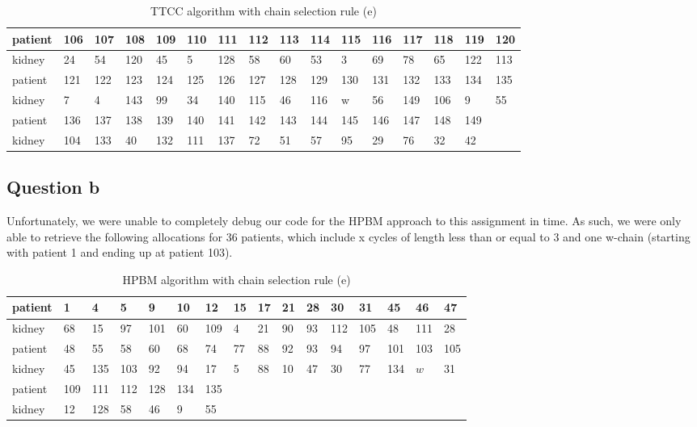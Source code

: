\documentclass{article}
\begin{document}
\begin{table}[H]
\begin{tabular}{llllllllllllllll}
        \toprule
        patient & 106 & 107 & 108 & 109 & 110 & 111 & 112 & 113 & 114 & 115 & 116 & 117 & 118 & 119 & 120 \\ \midrule
        kidney  & 24  & 54  & 120 & 45  & 5   & 128 & 58  & 60  & 53  & 3   & 69  & 78  & 65  & 122 & 113 \\ 
        \bottomrule
        
        \toprule
        patient & 121 & 122 & 123 & 124 & 125 & 126 & 127 & 128 & 129 & 130 & 131 & 132 & 133 & 134 & 135 \\ \midrule
        kidney  & 7   & 4   & 143 & 99  & 34  & 140 & 115 & 46  & 116 & w   & 56  & 149 & 106 & 9   & 55 \\
        \bottomrule

        \toprule
        patient & 136 & 137 & 138 & 139 & 140 & 141 & 142 & 143 & 144 & 145 & 146 & 147 & 148 & 149 &  \\ \midrule
        kidney  & 104 & 133 & 40  & 132 & 111 & 137 & 72  & 51  & 57  & 95  & 29  & 76  & 32  & 42  & \\
        \bottomrule
	\end{tabular}
	\caption{TTCC algorithm with chain selection rule (e)}
	\label{final.a}
\end{table}

\subsection{Question b}

Unfortunately, we were unable to completely debug our code for the HPBM approach to this assignment in time. As such, we were only able to retrieve the following allocations for 36 patients, which include x cycles of length less than or equal to 3 and one w-chain (starting with patient 1 and ending up at patient 103).

\begin{table}[H]
	\begin{tabular}{llllllllllllllll}
        \toprule
        patient & 1  & 4  & 5  & 9   & 10 & 12  & 15 & 17 & 21 & 28  & 30  & 31  & 45 & 46  & 47 \\ \midrule
        kidney  & 68 & 15 & 97 & 101 & 60 & 109 & 4  & 21 & 90 & 93  & 112 & 105 & 48 & 111 & 28 \\
        \bottomrule
 
        \toprule
        patient & 48 & 55  & 58  & 60 & 68 & 74 & 77 & 88 & 92 & 93 & 94 & 97 & 101 & 103 & 105 \\ \midrule
        kidney  & 45 & 135 & 103 & 92 & 94 & 17 & 5  & 88 & 10 & 47 & 30 & 77 & 134 & $w$ & 31  \\
        \bottomrule

        \toprule
        patient & 109 & 111 & 112 & 128 & 134 & 135 \\ \midrule
        kidney  & 12  & 128 & 58  & 46  & 9   & 55  \\
        \bottomrule
	\end{tabular}
	\caption{HPBM algorithm with chain selection rule (e)}
	\label{final.b}
\end{table}
\end{document}
